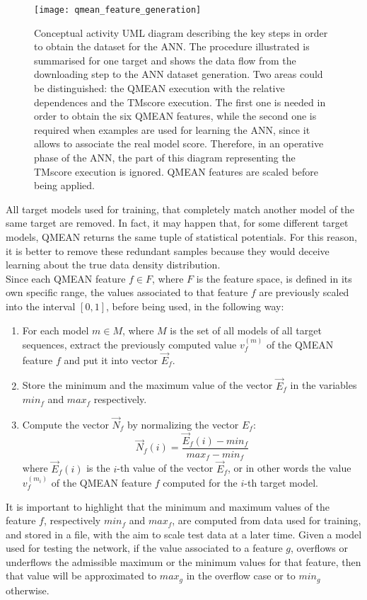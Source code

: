 \begin{figure}[tb]
	\begin{center}
		\texttt{[image: qmean\_feature\_generation]}
		\caption[Dataset generation UML diagram]{Conceptual activity UML diagram describing the key steps in order to obtain the dataset for the ANN. The procedure illustrated is summarised for one target and shows the data flow from the downloading step to the ANN dataset generation. Two areas could be distinguished: the QMEAN execution with the relative dependences and the TMscore execution. The first one is needed in order to obtain the six QMEAN features, while the second one is required when examples are used for learning the ANN, since it allows to associate the real model score. Therefore, in an operative phase of the ANN, the part of this diagram representing the TMscore execution is ignored. QMEAN features are scaled before being applied.}	
		\label{fig:qmean_feature_generation}
	\end{center}
\end{figure}

All target models used for training, that completely match another model of the same target are removed. In fact, it may happen that, for some different target models, QMEAN returns the same tuple of statistical potentials. For this reason, it is better to remove these redundant samples because they would deceive learning about the true data density distribution.\\
Since each QMEAN feature $f \in F$, where $F$ is the feature space, is defined in its own specific range, the values associated to that feature $f$ are previously scaled into the interval $[0, 1]$, before being used, in the following way:
\begin{enumerate}
 \item For each model $m \in M$, where $M$ is the set of all models of all target sequences, extract the previously computed value $v_f^{(m)}$ of the QMEAN feature $f$ and put it into vector $\vec{E}_f$.
 \item Store the minimum and the maximum value of the vector $\vec{E}_f$ in the variables $min_f$ and $max_f$ respectively.
 \item Compute the vector $\vec{N}_f$ by normalizing the vector $E_f$:
       \begin{equation}
       \label{eq:feature_normalization}
 	 \vec{N}_f(i) = \frac{\vec{E}_f(i) - min_f}{max_f - min_f}
       \end{equation}
       where $\vec{E}_f(i)$ is the $i$-th value of the vector $\vec{E}_f$, or in other words the value $v_f^{(m_i)}$ of the QMEAN feature $f$ computed for the $i$-th target model. 
\end{enumerate}
It is important to highlight that the minimum and maximum values of the feature $f$, respectively $min_f$ and $max_f$, are computed from data used for training, and stored in a file, with the aim to scale test data at a later time. Given a model used for testing the network, if the value associated to a feature $g$, overflows or underflows the admissible maximum or the minimum values for that feature, then that value will be approximated to $max_g$ in the overflow case or to $min_g$ otherwise.\\

